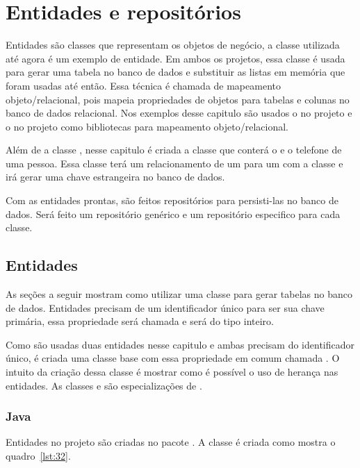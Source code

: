 \chapter{Entidades e repositórios}

Entidades são classes que representam os objetos de negócio, a classe  utilizada até agora é um exemplo de entidade. Em ambos os projetos, essa classe é usada para gerar uma tabela no banco de dados e substituir as listas em memória que foram usadas até então. Essa técnica é chamada de mapeamento objeto/relacional, pois mapeia propriedades de objetos para tabelas e colunas no banco de dados relacional. Nos exemplos desse capitulo são usados o  no projeto  e o  no projeto  como bibliotecas para mapeamento objeto/relacional.

Além de a classe , nesse capitulo é criada a classe  que conterá o  e o telefone de uma pessoa. Essa classe terá um relacionamento de um para um com a classe  e irá gerar uma chave estrangeira no banco de dados.

Com as entidades prontas, são feitos repositórios para persisti-las no banco de dados. Será feito um repositório genérico e um repositório especifico para cada classe.

\section{Entidades}

As seções a seguir mostram como utilizar uma classe para gerar tabelas no banco de dados. Entidades precisam de um identificador único para ser sua chave primária, essa propriedade será chamada  e será do tipo inteiro.

Como são usadas duas entidades nesse capitulo e ambas precisam do identificador único, é criada uma classe base com essa propriedade em comum chamada . O intuito da criação dessa classe é mostrar como é possível o uso de herança nas entidades. As classes  e  são especializações de .

\subsection{Java}

Entidades no projeto  são criadas no pacote . A classe  é criada como mostra o quadro~\ref{lst:32}.


